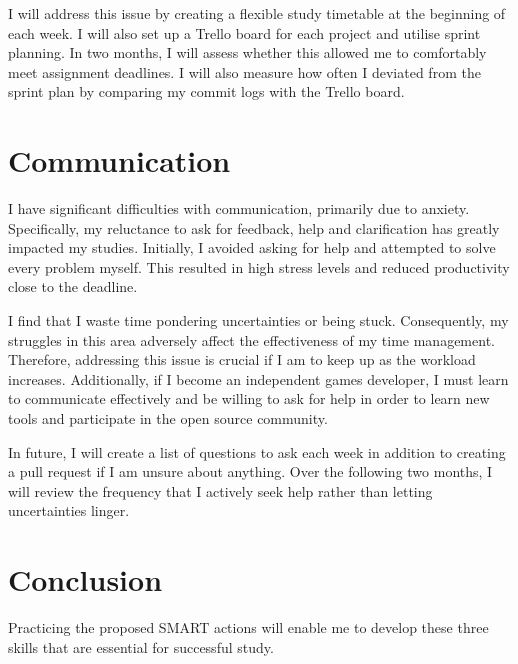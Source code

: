 \documentclass{scrartcl}
\begin{document}
I will address this issue by creating a flexible study timetable at the beginning of each week. I will also set up a Trello board for each project and utilise sprint planning. In two months, I will assess whether this allowed me to comfortably meet assignment deadlines. I will also measure how often I deviated from the sprint plan by comparing my commit logs with the Trello board.

\section{Communication}
I have significant difficulties with communication, primarily due to anxiety. Specifically, my reluctance to ask for feedback, help and clarification has greatly impacted my studies. Initially, I avoided asking for help and attempted to solve every problem myself. This resulted in high stress levels and reduced productivity close to the deadline.

I find that I waste time pondering uncertainties or being stuck. Consequently, my struggles in this area adversely affect the effectiveness of my time management. Therefore, addressing this issue is crucial if I am to keep up as the workload increases. Additionally, if I become an independent games developer, I must learn to communicate effectively and be willing to ask for help in order to learn new tools and participate in the open source community.

In future, I will create a list of questions to ask each week in addition to creating a pull request if I am unsure about anything. Over the following two months, I will review the frequency that I actively seek help rather than letting uncertainties linger.

\section{Conclusion}
Practicing the proposed SMART actions will enable me to develop these three skills that are essential for successful study.


\end{document}
